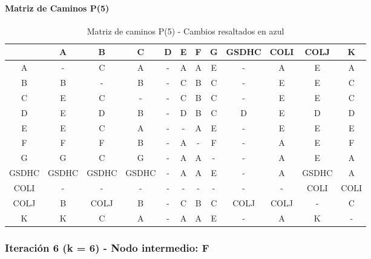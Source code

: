 \documentclass[12pt]{article}
\begin{document}
\paragraph{Matriz de Caminos P(5)}
\begin{table}[h!]
\centering
\begin{tabular}{|c|c|c|c|c|c|c|c|c|c|c|c|}
\hline
 & A & B & C & D & E & F & G & GSDHC & COLI & COLJ & K \\\hline
A & - & C & A & - & A & A & \cellcolor{lightblue} E & - & A & \cellcolor{lightblue} E & A \\\hline
B & B & - & B & - & C & B & C & - & \cellcolor{lightblue} E & \cellcolor{lightblue} E & C \\\hline
C & \cellcolor{lightblue} E & C & - & - & C & B & C & - & \cellcolor{lightblue} E & \cellcolor{lightblue} E & C \\\hline
D & \cellcolor{lightblue} E & D & B & - & D & B & C & D & \cellcolor{lightblue} E & D & D \\\hline
E & E & C & A & - & - & A & E & - & E & E & E \\\hline
F & F & F & B & - & A & - & F & - & A & \cellcolor{lightblue} E & F \\\hline
G & G & C & G & - & A & A & - & - & A & \cellcolor{lightblue} E & A \\\hline
GSDHC & GSDHC & GSDHC & GSDHC & - & A & A & \cellcolor{lightblue} E & - & A & GSDHC & A \\\hline
COLI & - & - & - & - & - & - & - & - & - & COLI & COLI \\\hline
COLJ & B & COLJ & B & - & C & B & C & COLJ & COLJ & - & C \\\hline
K & K & C & A & - & A & A & \cellcolor{lightblue} E & - & A & K & - \\\hline
\end{tabular}
\caption{Matriz de caminos P(5) - Cambios resaltados en azul}
\end{table}

\subsubsection{Iteración 6 (k = 6) - Nodo intermedio: F}
\end{document}
